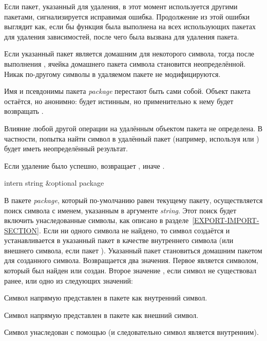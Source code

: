 \begin{defun}[Переменная]
\begin{defun}[Функция]
Если пакет, указанный для удаления, в этот момент используется другими пакетами,
сигнализируется исправимая ошибка. Продолжение из этой ошибки выглядит как, если
бы функция  была выполнена на всех использующих пакетах для
удаления зависимостей, после чего была вызвана  для удаления
пакета.

Если указанный пакет является домашним для некоторого символа, тогда после
выполнения , ячейка домашнего пакета символа становится
неопределённой. Никак по-другому символы в удаляемом пакете не модифицируются.

Имя и псевдонимы пакета \emph{package} перестают быть сами собой. Объект пакета
остаётся, но анонимно:  будет истинным, но 
применительно к нему будет возвращать .

Влияние любой другой операции на удалённым объектом пакета не определена. В
частности, попытка найти символ в удалённый пакет (например, используя 
или ) будет иметь неопределённый результат.

Если удаление было успешно,  возвращает , иначе .
\end{defun}

\begin{defun}[Функция]
intern string &optional package

В пакете \emph{package}, который по-умолчанию равен текущему пакету,
осуществляется поиск символа с именем, указанным в аргументе \emph{string}. Этот
поиск будет включить унаследованные символы, как описано в
разделе~\ref{EXPORT-IMPORT-SECTION}.
Если ни одного символа не найдено, то символ создаётся и устанавливается в
указанный пакет в качестве внутреннего символа (или внешнего символа, если пакет
). Указанный пакет становиться домашним пакетом для созданного символа.
Возвращается два значения. Первое является символом, который был найден или
создан. Второе значение {\false}, если символ не существовал ранее, или одно из
следующих значений:
\begin{indentdesc}{6pc}
\item[\cd{:internal}]
Символ напрямую представлен в пакете как внутренний символ.

\item[\cd{:external}]
Символ напрямую представлен в пакете как внешний символ.

\item[\cd{:inherited}]
Символ унаследован с помощью  (и следовательно символ является
внутренним).
\end{indentdesc}


\end{defun}
\end{defun}

